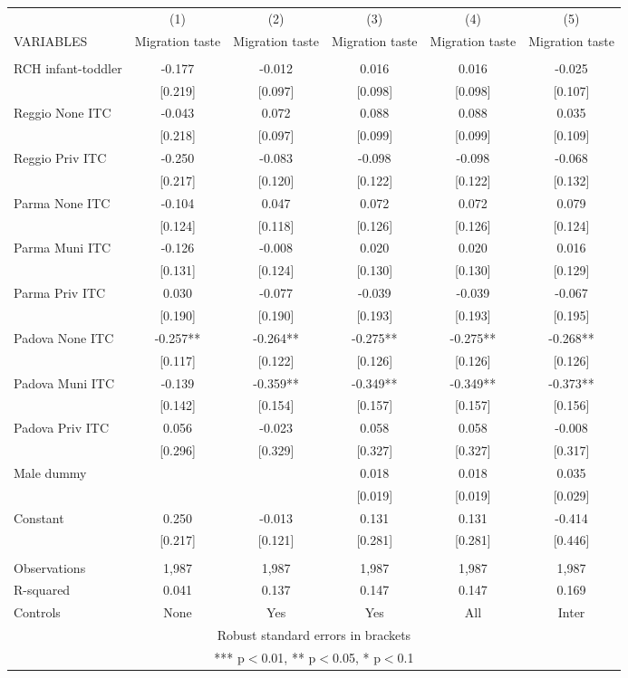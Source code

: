 \begin{tabular}{lccccc} \hline
 & (1) & (2) & (3) & (4) & (5) \\
VARIABLES & Migration taste & Migration taste & Migration taste & Migration taste & Migration taste \\ \hline
 &  &  &  &  &  \\
RCH infant-toddler & -0.177 & -0.012 & 0.016 & 0.016 & -0.025 \\
 & [0.219] & [0.097] & [0.098] & [0.098] & [0.107] \\
Reggio None ITC & -0.043 & 0.072 & 0.088 & 0.088 & 0.035 \\
 & [0.218] & [0.097] & [0.099] & [0.099] & [0.109] \\
Reggio Priv ITC & -0.250 & -0.083 & -0.098 & -0.098 & -0.068 \\
 & [0.217] & [0.120] & [0.122] & [0.122] & [0.132] \\
Parma None ITC & -0.104 & 0.047 & 0.072 & 0.072 & 0.079 \\
 & [0.124] & [0.118] & [0.126] & [0.126] & [0.124] \\
Parma Muni ITC & -0.126 & -0.008 & 0.020 & 0.020 & 0.016 \\
 & [0.131] & [0.124] & [0.130] & [0.130] & [0.129] \\
Parma Priv ITC & 0.030 & -0.077 & -0.039 & -0.039 & -0.067 \\
 & [0.190] & [0.190] & [0.193] & [0.193] & [0.195] \\
Padova None ITC & -0.257** & -0.264** & -0.275** & -0.275** & -0.268** \\
 & [0.117] & [0.122] & [0.126] & [0.126] & [0.126] \\
Padova Muni ITC & -0.139 & -0.359** & -0.349** & -0.349** & -0.373** \\
 & [0.142] & [0.154] & [0.157] & [0.157] & [0.156] \\
Padova Priv ITC & 0.056 & -0.023 & 0.058 & 0.058 & -0.008 \\
 & [0.296] & [0.329] & [0.327] & [0.327] & [0.317] \\
Male dummy &  &  & 0.018 & 0.018 & 0.035 \\
 &  &  & [0.019] & [0.019] & [0.029] \\
Constant & 0.250 & -0.013 & 0.131 & 0.131 & -0.414 \\
 & [0.217] & [0.121] & [0.281] & [0.281] & [0.446] \\
 &  &  &  &  &  \\
Observations & 1,987 & 1,987 & 1,987 & 1,987 & 1,987 \\
R-squared & 0.041 & 0.137 & 0.147 & 0.147 & 0.169 \\
 Controls & None & Yes & Yes & All & Inter \\ \hline
\multicolumn{6}{c}{ Robust standard errors in brackets} \\
\multicolumn{6}{c}{ *** p$<$0.01, ** p$<$0.05, * p$<$0.1} \\
\end{tabular}
